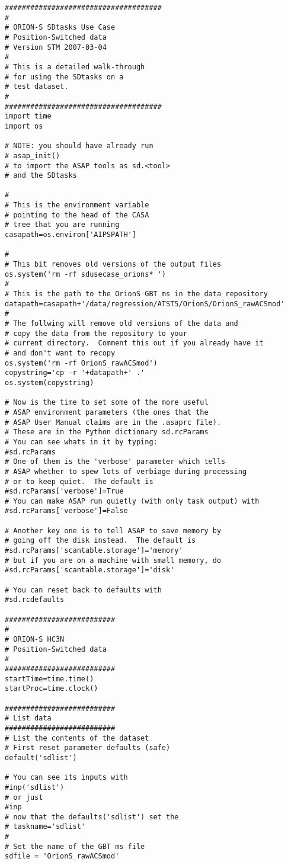 \begin{verbatim}
#####################################
#
# ORION-S SDtasks Use Case
# Position-Switched data
# Version STM 2007-03-04
#
# This is a detailed walk-through
# for using the SDtasks on a
# test dataset.
#
#####################################
import time
import os

# NOTE: you should have already run
# asap_init()
# to import the ASAP tools as sd.<tool>
# and the SDtasks

#
# This is the environment variable
# pointing to the head of the CASA
# tree that you are running
casapath=os.environ['AIPSPATH']

#
# This bit removes old versions of the output files
os.system('rm -rf sdusecase_orions* ')
#
# This is the path to the OrionS GBT ms in the data repository
datapath=casapath+'/data/regression/ATST5/OrionS/OrionS_rawACSmod'
#
# The follwing will remove old versions of the data and
# copy the data from the repository to your
# current directory.  Comment this out if you already have it
# and don't want to recopy
os.system('rm -rf OrionS_rawACSmod')
copystring='cp -r '+datapath+' .'
os.system(copystring)

# Now is the time to set some of the more useful
# ASAP environment parameters (the ones that the
# ASAP User Manual claims are in the .asaprc file).
# These are in the Python dictionary sd.rcParams
# You can see whats in it by typing:
#sd.rcParams
# One of them is the 'verbose' parameter which tells
# ASAP whether to spew lots of verbiage during processing
# or to keep quiet.  The default is
#sd.rcParams['verbose']=True
# You can make ASAP run quietly (with only task output) with
#sd.rcParams['verbose']=False

# Another key one is to tell ASAP to save memory by
# going off the disk instead.  The default is
#sd.rcParams['scantable.storage']='memory'
# but if you are on a machine with small memory, do
#sd.rcParams['scantable.storage']='disk'

# You can reset back to defaults with
#sd.rcdefaults

##########################
#
# ORION-S HC3N
# Position-Switched data
#
##########################
startTime=time.time()
startProc=time.clock()

##########################
# List data
##########################
# List the contents of the dataset
# First reset parameter defaults (safe)
default('sdlist')

# You can see its inputs with
#inp('sdlist')
# or just
#inp
# now that the defaults('sdlist') set the
# taskname='sdlist'
#
# Set the name of the GBT ms file
sdfile = 'OrionS_rawACSmod'


\end{verbatim}
